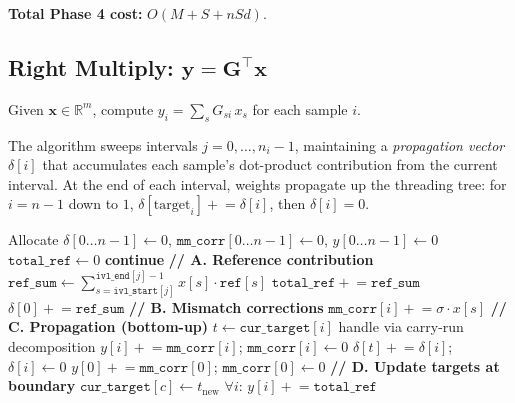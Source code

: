 \documentclass[11pt]{article}
\begin{document}
\textbf{Total Phase 4 cost:} $O(M + S + nSd)$.

\subsection{Right Multiply: $\mathbf{y} = \mathbf{G}^\top \mathbf{x}$}

Given $\mathbf{x} \in \mathbb{R}^m$, compute $y_i = \sum_s G_{si} \,
x_s$ for each sample $i$.

The algorithm sweeps intervals $j = 0, \ldots, n_i{-}1$, maintaining a
\emph{propagation vector} $\delta[i]$ that accumulates each sample's
dot-product contribution from the current interval.  At the end of each
interval, weights propagate up the threading tree: for $i = n{-}1$ down to
$1$, $\delta[\text{target}_i] \mathrel{+}= \delta[i]$, then
$\delta[i] = 0$.

\begin{algorithm}[h]
\caption{Tree-shuttle right multiply (single-threaded core)}
\begin{algorithmic}[1]
\State Allocate $\delta[0 \ldots n{-}1] \gets 0$,
       $\texttt{mm\_corr}[0 \ldots n{-}1] \gets 0$,
       $y[0 \ldots n{-}1] \gets 0$
\State $\texttt{total\_ref} \gets 0$
        \State \textbf{continue} 
    \EndIf
    \State \textbf{// A. Reference contribution}
    \State $\texttt{ref\_sum} \gets \sum_{s=\texttt{ivl\_start}[j]}^{\texttt{ivl\_end}[j]-1} x[s] \cdot \texttt{ref}[s]$
    \State $\texttt{total\_ref} \mathrel{+}= \texttt{ref\_sum}$
    \State $\delta[0] \mathrel{+}= \texttt{ref\_sum}$
    \State \textbf{// B. Mismatch corrections}
        \State $\texttt{mm\_corr}[i] \mathrel{+}= \sigma \cdot x[s]$
    \EndFor
    \State \textbf{// C. Propagation (bottom-up)}
        \State $t \gets \texttt{cur\_target}[i]$
         
            \State handle via carry-run decomposition
        \Else
            \State $y[i] \mathrel{+}= \texttt{mm\_corr}[i]$;
                   $\texttt{mm\_corr}[i] \gets 0$
            \State $\delta[t] \mathrel{+}= \delta[i]$;
                   $\delta[i] \gets 0$
        \EndIf
    \EndFor
    \State $y[0] \mathrel{+}= \texttt{mm\_corr}[0]$;
           $\texttt{mm\_corr}[0] \gets 0$
    \State \textbf{// D. Update targets at boundary}
        \State $\texttt{cur\_target}[c] \gets t_\text{new}$
    \EndFor
\EndFor
\State $\forall i$: $y[i] \mathrel{+}= \texttt{total\_ref}$
\end{algorithmic}
\end{algorithm}
\end{document}
